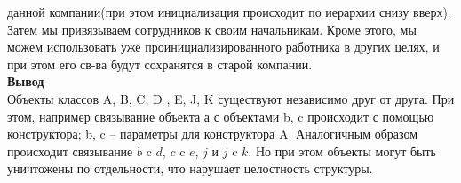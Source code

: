 \documentclass[12pt]{report}
\begin{document}
    данной компании(при этом инициализация происходит по иерархии снизу вверх). Затем мы привязываем сотрудников к своим начальникам.
    Кроме этого, мы можем использовать уже проинициализированного работника в других целях, 
    и при этом его св-ва будут сохранятся в старой компании.\\
    \textbf{Вывод}\\
    Объекты классов A, B, C, D , E, J, K существуют независимо друг от друга. 
    При этом, например связывание объекта а с объектами b, c происходит с помощью конструктора; 
    b, c – параметры для конструктора A.
    Аналогичным образом происходит связывание $b$ c $d$, $c$ c $e$, $j$ и $j$  c $k$. 
    Но при этом объекты могут быть уничтожены по отдельности, что нарушает целостность структуры.
\end{document}
